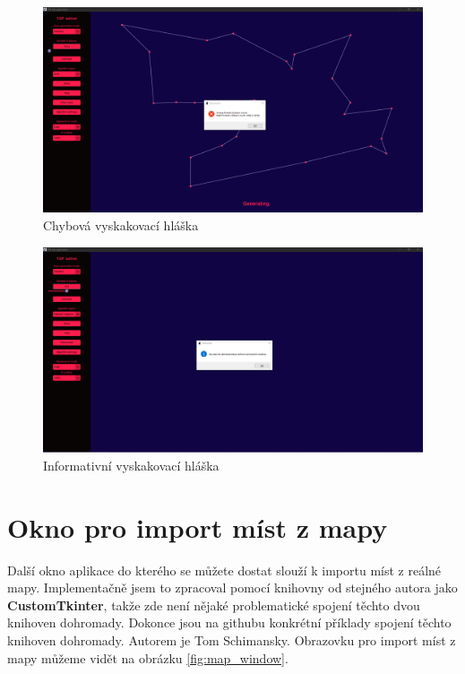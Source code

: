 \begin{figure}
    \centering
    \includegraphics[width=15cm]{obrazky-figures/main_window_error.png}
    \caption{Chybová vyskakovací hláška}
    \label{fig:main_window_error}
\end{figure}
\begin{figure}
    \centering
    \includegraphics[width=15cm]{obrazky-figures/main_window_info_no_places.png}
    \caption{Informativní vyskakovací hláška}
    \label{fig:main_window_info}
\end{figure}



\newpage
\section{Okno pro import míst z mapy}
Další okno aplikace do kterého se můžete dostat slouží k importu míst z reálné mapy. Implementačně jsem to zpracoval pomocí knihovny od stejného autora jako \textbf{CustomTkinter}, takže zde není nějaké problematické spojení těchto dvou knihoven dohromady. Dokonce jsou na githubu konkrétní příklady spojení těchto knihoven dohromady\cite{TkinterMapView}. Autorem je Tom Schimansky. Obrazovku pro import míst z mapy můžeme vidět na obrázku \ref{fig:map_window}. 
